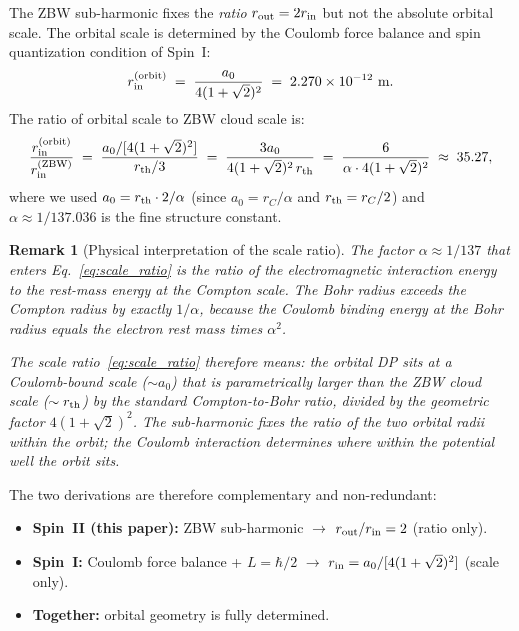 \documentclass[12pt]{article}
\newtheorem{remark}[theorem]{Remark}
\newcommand{\rC}{r_C}
\newcommand{\rth}{r_{\rm th}}
\newcommand{\rin}{r_{\rm in}}
\newcommand{\rout}{r_{\rm out}}
\newcommand{\aBohr}{a_0}
\begin{document}
The ZBW sub-harmonic fixes the \emph{ratio} $\rout = 2\rin$ but not
the absolute orbital scale.  The orbital scale is determined by the
Coulomb force balance and spin quantization condition of Spin~I:
\begin{equation}
  \rin^{\rm (orbit)} \;=\; \frac{\aBohr}{4(1+\sqrt{2})^2}
  \;=\; 2.270\times 10^{-12}\ \text{m}.
  \label{eq:orbital_scale}
\end{equation}
The ratio of orbital scale to ZBW cloud scale is:
\begin{equation}
  \frac{\rin^{\rm (orbit)}}{\rin^{\rm (ZBW)}}
  \;=\; \frac{\aBohr/[4(1+\sqrt{2})^2]}{\rth/3}
  \;=\; \frac{3\aBohr}{4(1+\sqrt{2})^2\,\rth}
  \;=\; \frac{6}{\alpha\cdot 4(1+\sqrt{2})^2}
  \;\approx\; 35.27,
  \label{eq:scale_ratio}
\end{equation}
where we used $\aBohr = \rth\cdot 2/\alpha$ (since $\aBohr = \rC/\alpha$
and $\rth = \rC/2$) and $\alpha \approx 1/137.036$ is the fine
structure constant.

\begin{remark}[Physical interpretation of the scale ratio]
The factor $\alpha \approx 1/137$ that enters Eq.~\eqref{eq:scale_ratio}
is the ratio of the electromagnetic interaction energy to the rest-mass
energy at the Compton scale.  The Bohr radius exceeds the Compton
radius by exactly $1/\alpha$, because the Coulomb binding energy at
the Bohr radius equals the electron rest mass times $\alpha^2$.

The scale ratio~\eqref{eq:scale_ratio} therefore means: the orbital
DP sits at a Coulomb-bound scale ($\sim\aBohr$) that is parametrically
larger than the ZBW cloud scale ($\sim\rth$) by the standard
Compton-to-Bohr ratio, divided by the geometric factor $4(1+\sqrt{2})^2$.
The sub-harmonic fixes the ratio of the two orbital radii within the
orbit; the Coulomb interaction determines where within the potential
well the orbit sits.
\end{remark}

The two derivations are therefore complementary and non-redundant:
\begin{itemize}[noitemsep]
  \item \textbf{Spin~II (this paper):} ZBW sub-harmonic $\to$
    $\rout/\rin = 2$ (ratio only).
  \item \textbf{Spin~I:} Coulomb force balance + $L = \hbar/2$
    $\to$ $\rin = \aBohr/[4(1+\sqrt{2})^2]$ (scale only).
  \item \textbf{Together:} orbital geometry is fully determined.
\end{itemize}
\end{document}
